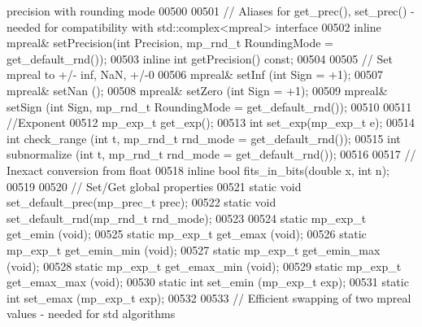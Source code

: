 \begin{DoxyCode}
{       precision with rounding mode}
00500 
00501     \textcolor{comment}{// Aliases for get\_prec(), set\_prec() - needed for compatibility with std::complex<mpreal> interface}
00502     \textcolor{keyword}{inline} mpreal&      setPrecision(\textcolor{keywordtype}{int} Precision, mp\_rnd\_t RoundingMode = get\_default\_rnd());
00503     \textcolor{keyword}{inline} \textcolor{keywordtype}{int}          getPrecision() \textcolor{keyword}{const};
00504 
00505     \textcolor{comment}{// Set mpreal to +/- inf, NaN, +/-0}
00506     mpreal&        setInf  (\textcolor{keywordtype}{int} Sign = +1);
00507     mpreal&        setNan  ();
00508     mpreal&        setZero (\textcolor{keywordtype}{int} Sign = +1);
00509     mpreal&        setSign (\textcolor{keywordtype}{int} Sign, mp\_rnd\_t RoundingMode = get\_default\_rnd());
00510 
00511     \textcolor{comment}{//Exponent}
00512     mp\_exp\_t get\_exp();
00513     \textcolor{keywordtype}{int} set\_exp(mp\_exp\_t e);
00514     \textcolor{keywordtype}{int} check\_range  (\textcolor{keywordtype}{int} t, mp\_rnd\_t rnd\_mode = get\_default\_rnd());
00515     \textcolor{keywordtype}{int} subnormalize (\textcolor{keywordtype}{int} t, mp\_rnd\_t rnd\_mode = get\_default\_rnd());
00516 
00517     \textcolor{comment}{// Inexact conversion from float}
00518     \textcolor{keyword}{inline} \textcolor{keywordtype}{bool} fits\_in\_bits(\textcolor{keywordtype}{double} x, \textcolor{keywordtype}{int} n);
00519 
00520     \textcolor{comment}{// Set/Get global properties}
00521     \textcolor{keyword}{static} \textcolor{keywordtype}{void}            set\_default\_prec(mp\_prec\_t prec);
00522     \textcolor{keyword}{static} \textcolor{keywordtype}{void}            set\_default\_rnd(mp\_rnd\_t rnd\_mode);
00523 
00524     \textcolor{keyword}{static} mp\_exp\_t  get\_emin (\textcolor{keywordtype}{void});
00525     \textcolor{keyword}{static} mp\_exp\_t  get\_emax (\textcolor{keywordtype}{void});
00526     \textcolor{keyword}{static} mp\_exp\_t  get\_emin\_min (\textcolor{keywordtype}{void});
00527     \textcolor{keyword}{static} mp\_exp\_t  get\_emin\_max (\textcolor{keywordtype}{void});
00528     \textcolor{keyword}{static} mp\_exp\_t  get\_emax\_min (\textcolor{keywordtype}{void});
00529     \textcolor{keyword}{static} mp\_exp\_t  get\_emax\_max (\textcolor{keywordtype}{void});
00530     \textcolor{keyword}{static} \textcolor{keywordtype}{int}       set\_emin (mp\_exp\_t exp);
00531     \textcolor{keyword}{static} \textcolor{keywordtype}{int}       set\_emax (mp\_exp\_t exp);
00532 
00533     \textcolor{comment}{// Efficient swapping of two mpreal values - needed for std algorithms}

\end{DoxyCode}
